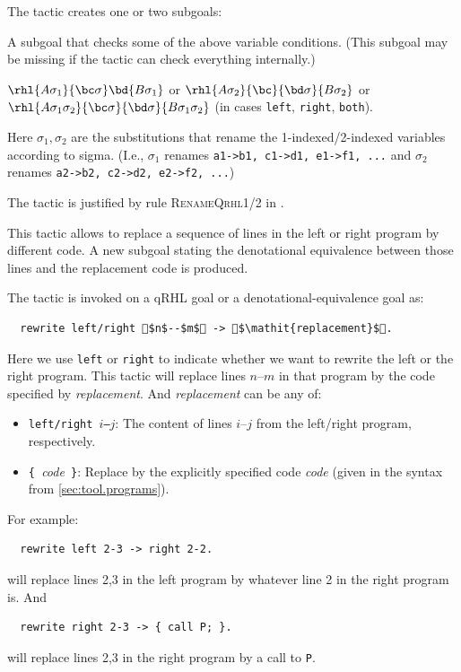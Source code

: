 \documentclass{article}
\renewcommand\ruleref[1]{rule \hbox{\textsc{#1}}}
\begin{document}
\medskip
\noindent
%
The tactic creates one or two subgoals:
\begin{compactitem}
\item A subgoal that checks some of the above variable
  conditions. (This subgoal may be missing if the tactic can check
  everything internally.)
\item $\rhl{A\sigma_1}{\bc\sigma}\bd{B\sigma_1}$
  or
  $\rhl{A\sigma_2}{\bc}{\bd\sigma}{B\sigma_2}$
  or
  $\rhl{A\sigma_1\sigma_2}{\bc\sigma}{\bd\sigma}{B\sigma_1\sigma_2}$
  (in cases \texttt{left}, \texttt{right}, \texttt{both}).
  
  Here $\sigma_1,\sigma_2$ are the substitutions that rename the
  1-indexed/2-indexed variables according to sigma. (I.e., $\sigma_1$
  renames \texttt{a1->b1, c1->d1, e1->f1, ...} and $\sigma_2$ renames
  \texttt{a2->b2, c2->d2, e2->f2, ...})
\end{compactitem}

\medskip
\noindent
The tactic is justified by \ruleref{RenameQrhl1/2} in
\cite{local-variables}.



This tactic allows to replace a sequence of lines in the left or right program by different code.
A new subgoal stating the denotational equivalence between those lines and the replacement code is produced.

The tactic is invoked on a qRHL goal or a denotational-equivalence goal as:
\begin{lstlisting}
  rewrite left/right $n$--$m$ -> $\mathit{replacement}$.
\end{lstlisting}
Here we use \texttt{left} or \texttt{right} to indicate whether we want to rewrite the left or the right program.
This tactic will replace lines $n$--$m$ in that program by the code specified by \textit{replacement}.
And \textit{replacement} can be any of:
\begin{itemize}
\item \texttt{left/right $i$--$j$}: The content of lines $i$--$j$ from the left/right program, respectively.
\item \texttt{\{ }\textit{code}\texttt{ \}}: Replace by the explicitly specified code \textit{code} (given in the syntax from \autoref{sec:tool.programs}).
\end{itemize}

\noindent For example:
\begin{lstlisting}
  rewrite left 2-3 -> right 2-2.
\end{lstlisting}
will replace lines 2,3 in the left program by whatever line 2 in the right program is. And
\begin{lstlisting}
  rewrite right 2-3 -> { call P; }.
\end{lstlisting}
will replace lines 2,3 in the right program by a call to \texttt{P}.
\end{document}
